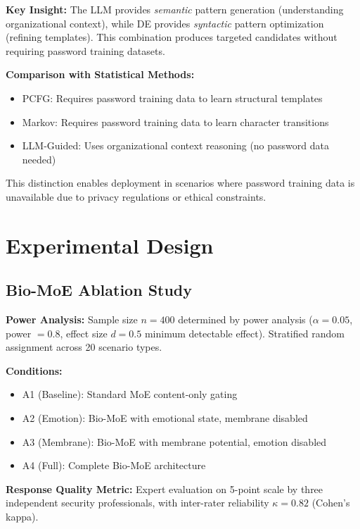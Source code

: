 \documentclass[preprint,12pt]{elsarticle}
\begin{document}
\textbf{Key Insight:} The LLM provides \textit{semantic} pattern generation (understanding organizational context), while DE provides \textit{syntactic} pattern optimization (refining templates). This combination produces targeted candidates without requiring password training datasets.

\textbf{Comparison with Statistical Methods:}
\begin{itemize}
    \item PCFG: Requires password training data to learn structural templates
    \item Markov: Requires password training data to learn character transitions
    \item LLM-Guided: Uses organizational context reasoning (no password data needed)
\end{itemize}

This distinction enables deployment in scenarios where password training data is unavailable due to privacy regulations or ethical constraints.

\section{Experimental Design}
\label{sec:experiments}

\subsection{Bio-MoE Ablation Study}

\textbf{Power Analysis:} Sample size $n=400$ determined by power analysis ($\alpha=0.05$, power $=0.8$, effect size $d=0.5$ minimum detectable effect). Stratified random assignment across 20 scenario types.

\textbf{Conditions:}
\begin{itemize}
    \item A1 (Baseline): Standard MoE content-only gating
    \item A2 (Emotion): Bio-MoE with emotional state, membrane disabled
    \item A3 (Membrane): Bio-MoE with membrane potential, emotion disabled
    \item A4 (Full): Complete Bio-MoE architecture
\end{itemize}

\textbf{Response Quality Metric:} Expert evaluation on 5-point scale by three independent security professionals, with inter-rater reliability $\kappa = 0.82$ (Cohen's kappa).
\end{document}

